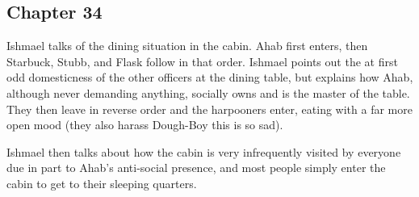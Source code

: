 \subsection{Chapter 34}

Ishmael talks of the dining situation in the cabin. Ahab first enters, then
Starbuck, Stubb, and Flask follow in that order. Ishmael points out the at
first odd domesticness of the other officers at the dining table, but explains
how Ahab, although never demanding anything, socially owns and is the master of
the table. They then leave in reverse order and the harpooners enter, eating
with a far more open mood (they also harass Dough-Boy this is so sad).

Ishmael then talks about how the cabin is very infrequently visited by everyone
due in part to Ahab's anti-social presence, and most people simply enter the
cabin to get to their sleeping quarters.
